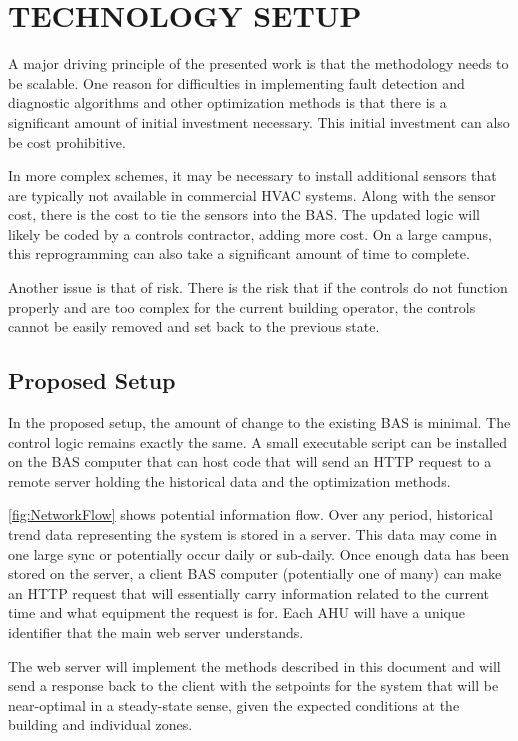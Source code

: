 \chapter{\uppercase{Technology Setup}}

A major driving principle of the presented work is that the methodology
needs to be scalable. One reason for difficulties in implementing fault
detection and diagnostic algorithms and other optimization methods is
that there is a significant amount of initial investment necessary. This
initial investment can also be cost prohibitive. 

In more complex schemes, it may be necessary to install additional
sensors that are typically not available in commercial HVAC systems.
Along with the sensor cost, there is the cost to tie the sensors into the
BAS. The updated logic will likely be coded by a controls contractor,
adding more cost. On a large campus, this reprogramming can also take a
significant amount of time to complete. 

Another issue is that of risk. There is the risk that if the controls do
not function properly and are too complex for the current building
operator, the controls cannot be easily removed and set back to the 
previous state. 

\section{Proposed Setup}

In the proposed setup, the amount of change to the existing BAS is
minimal. The control logic remains exactly the same. A small executable
script can be installed on the BAS computer that can host code that will
send an HTTP request to a remote server holding the historical data and
the optimization methods. 


\figref{} \ref{fig:NetworkFlow} shows potential information flow. Over
any period, historical trend data representing the system is stored
in a server. This data may come in one large sync or potentially occur
daily or sub-daily. Once enough data has been stored on the server, a
client BAS computer (potentially one of many) can make an HTTP request
that will essentially carry information related to the current time and
what equipment the request is for. Each AHU will have a unique
identifier that the main web server understands. 

The web server will implement the methods described in this document and
will send a response back to the client with the setpoints for the
system that will be near-optimal in a steady-state sense, given the
expected conditions at the building and individual zones. 

